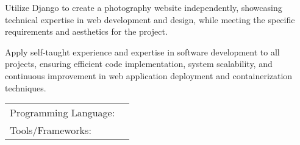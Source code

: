 \documentclass[]{awesome-cv}
\begin{document}
\begin{cventries}
{\begin{cvitems}
		\item {Utilize Django to create a photography website independently, showcasing technical expertise in web development and design, while meeting the specific requirements and aesthetics for the project.}
		\item {Apply self-taught experience and expertise in software development to all projects, ensuring efficient code implementation, system scalability, and continuous improvement in web application deployment and containerization techniques.}
		\end{cvitems}}
\end{cventries}
\begin{cventries}
	\cventry
	{}
	{\def\arraystretch{1.15}{\begin{tabular}{ l l }
		Programming Language:  & {\skill{ Python, Bash, C++, Html, CSS3}} \\
		Tools/Frameworks:  & {\skill{ Jenkins, Frappe, Docker, Vagrant, Libreoffice, Django, Ansible, Git, AWS}} \\
		\end{tabular}}}
	{}
	{}
	{}
\end{cventries}
\end{document}
